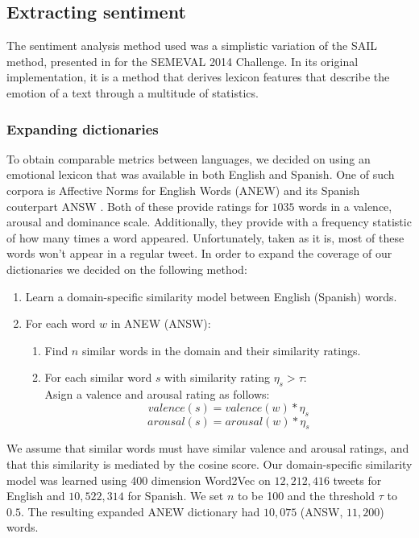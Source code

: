 \documentclass[11pt]{article}
\begin{document}
\subsection{Extracting sentiment}
The sentiment analysis method used was a simplistic variation of the SAIL method, presented in \cite{malandrakis_sail_2014} for the SEMEVAL 2014 Challenge. In its original implementation, it is a method that derives lexicon features that describe the emotion of a text through a multitude of statistics. 

\subsubsection{Expanding dictionaries}
To obtain comparable metrics between languages, we decided on using an emotional lexicon that was available in both English and Spanish. One of such corpora is Affective Norms for English Words (ANEW) \cite{bradley1999affective} and its Spanish couterpart ANSW \cite{redondo2007spanish}. Both of these provide ratings for $1035$ words in a valence, arousal and dominance scale. Additionally, they provide with a frequency statistic of how many times a word appeared. Unfortunately, taken as it is, most of these words won't appear in a regular tweet. In order to expand the coverage of our dictionaries we decided on the following method:

\begin{enumerate}
	\item Learn a domain-specific similarity model between English (Spanish) words.
	\item For each word $w$ in ANEW (ANSW):
	\begin{enumerate}
	 	\item Find $n$ similar words in the domain and their similarity ratings.
	 	\item For each similar word $s$ with similarity rating $\eta_s > \tau$: \\
	 		  Asign a valence and arousal rating as follows:
		 		\[ valence(s) = valence(w) * \eta_s	\]
		 		\[ arousal(s) = arousal(w) * \eta_s	\]
	 \end{enumerate} 
\end{enumerate}

We assume that similar words must have similar valence and arousal ratings, and that this similarity is mediated by the cosine score. Our domain-specific similarity model was learned using 400 dimension Word2Vec \cite{mikolov2013distributed} on $12,212,416$ tweets for English and $10,522,314$ for Spanish. We set $n$ to be 100 and the threshold $\tau$ to $0.5$. The resulting expanded ANEW dictionary had $10,075$ (ANSW, $11,200$) words. 
\end{document}
